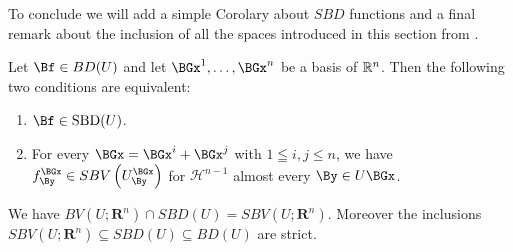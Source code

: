 To conclude we will add a simple Corolary about  $SBD$ functions and a final remark about the inclusion of all the spaces introduced in this section from \cite{SBD3}.
\begin{corollary}
 Let $\Bf \in B D(U)$ and let $\BGx^1, \ldots, \BGx^n$ be a basis of $\mathbb{R}^n$. Then the following two conditions are equivalent:
 \begin{enumerate}
 \item $\Bf \in \operatorname{SBD}(U)$.
\item  For every $\BGx=\BGx^i+\BGx^j$ with $1 \leqq i, j \leq n$, we have $f_\By^{\BGx} \in S B V\left(U_\By^{\BGx}\right)$ for $\mathscr{H}^{n-1}$ almost every $\By \in U \BGx$.
\end{enumerate}
\end{corollary}

\begin{theorem}
We have $B V\left(U ; \mathbf{R}^n\right) \cap S B D(U)=S B V\left(U ; \mathbf{R}^n\right)$. Moreover the inclusions $S B V\left(U; \mathbf{R}^n\right) \subseteq S B D(U) \subseteq B D(U)$ are strict.
\end{theorem}
